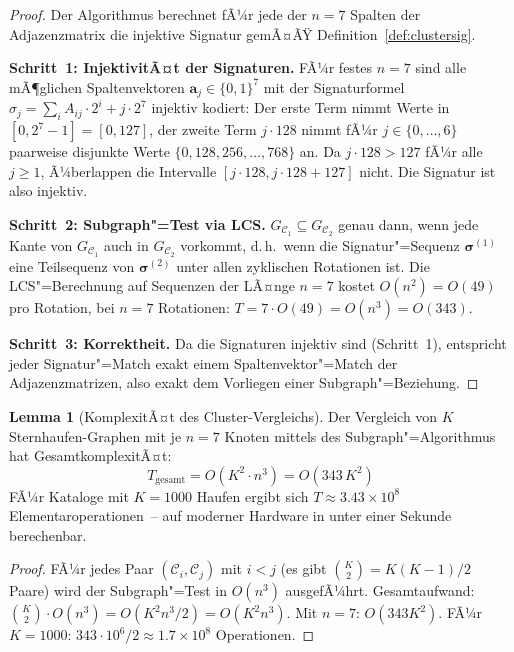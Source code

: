 ﻿\documentclass[a4paper,12pt]{article}
\theoremstyle{definition}
\newtheorem{lemma}{Lemma}
\begin{document}
\begin{proof}
    Der Algorithmus berechnet fÃ¼r jede der $n = 7$ Spalten der Adjazenzmatrix
    die injektive Signatur gemÃ¤ÃŸ Definition~\ref{def:clustersig}.

    \textbf{Schritt~1: InjektivitÃ¤t der Signaturen.}
    FÃ¼r festes $n = 7$ sind alle mÃ¶glichen Spaltenvektoren
    $\mathbf{a}_j \in \{0,1\}^7$ mit der Signaturformel
    $\sigma_j = \sum_i A_{ij} \cdot 2^i + j \cdot 2^7$ injektiv kodiert:
    Der erste Term nimmt Werte in $[0, 2^7-1] = [0,127]$,
    der zweite Term $j \cdot 128$ nimmt fÃ¼r $j \in \{0,\ldots,6\}$
    paarweise disjunkte Werte $\{0, 128, 256, \ldots, 768\}$ an.
    Da $j \cdot 128 > 127$ fÃ¼r alle $j \geq 1$, Ã¼berlappen die Intervalle
    $[j \cdot 128, j \cdot 128 + 127]$ nicht. Die Signatur ist also injektiv.

    \textbf{Schritt~2: Subgraph"=Test via LCS.}
    $G_{\mathcal{C}_1} \subseteq G_{\mathcal{C}_2}$ genau dann, wenn
    jede Kante von $G_{\mathcal{C}_1}$ auch in $G_{\mathcal{C}_2}$ vorkommt,
    d.\,h.\ wenn die Signatur"=Sequenz $\boldsymbol{\sigma}^{(1)}$ eine
    Teilsequenz von $\boldsymbol{\sigma}^{(2)}$ unter allen zyklischen
    Rotationen ist. Die LCS"=Berechnung auf Sequenzen der LÃ¤nge $n = 7$
    kostet $O(n^2) = O(49)$ pro Rotation, bei $n = 7$ Rotationen:
    $T = 7 \cdot O(49) = O(n^3) = O(343)$.

    \textbf{Schritt~3: Korrektheit.}
    Da die Signaturen injektiv sind (Schritt~1), entspricht jeder
    Signatur"=Match exakt einem Spaltenvektor"=Match der Adjazenzmatrizen,
    also exakt dem Vorliegen einer Subgraph"=Beziehung. \qedhere
\end{proof}

\begin{lemma}[KomplexitÃ¤t des Cluster-Vergleichs]
\label{lem:cluster_komplex}
    Der Vergleich von $K$ Sternhaufen-Graphen mit je $n = 7$ Knoten
    mittels des Subgraph"=Algorithmus hat GesamtkomplexitÃ¤t:
    \[
        T_{\text{gesamt}} = O(K^2 \cdot n^3) = O(343\,K^2)
    \]
    FÃ¼r Kataloge mit $K = 1000$ Haufen ergibt sich
    $T \approx 3.43 \times 10^8$ Elementaroperationen~-- auf moderner
    Hardware in unter einer Sekunde berechenbar.
\end{lemma}

\begin{proof}
    FÃ¼r jedes Paar $(\mathcal{C}_i, \mathcal{C}_j)$ mit
    $i < j$ (es gibt $\binom{K}{2} = K(K-1)/2$ Paare) wird der
    Subgraph"=Test in $O(n^3)$ ausgefÃ¼hrt.
    Gesamtaufwand: $\binom{K}{2} \cdot O(n^3) = O(K^2 n^3 / 2) = O(K^2 n^3)$.
    Mit $n = 7$: $O(343 K^2)$. FÃ¼r $K=1000$:
    $343 \cdot 10^6 / 2 \approx 1.7 \times 10^8$ Operationen. \qedhere
\end{proof}
\end{document}
